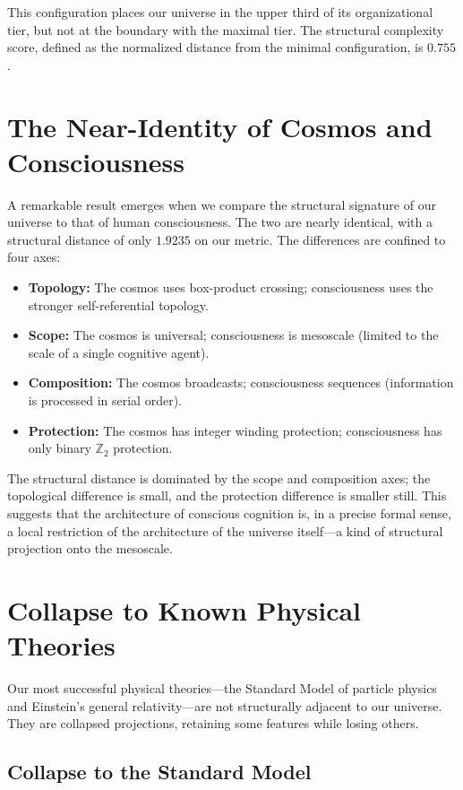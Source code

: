 \documentclass[11pt,a4paper]{article}
\theoremstyle{definition}
\begin{document}
This configuration places our universe in the upper third of its organizational tier, but not at the boundary with the maximal tier. The structural complexity score, defined as the normalized distance from the minimal configuration, is \(0.755\).

\section{The Near-Identity of Cosmos and Consciousness}

A remarkable result emerges when we compare the structural signature of our universe to that of human consciousness. The two are nearly identical, with a structural distance of only \(1.9235\) on our metric. The differences are confined to four axes:

\begin{itemize}
    \item \textbf{Topology:} The cosmos uses box-product crossing; consciousness uses the stronger self-referential topology.
    \item \textbf{Scope:} The cosmos is universal; consciousness is mesoscale (limited to the scale of a single cognitive agent).
    \item \textbf{Composition:} The cosmos broadcasts; consciousness sequences (information is processed in serial order).
    \item \textbf{Protection:} The cosmos has integer winding protection; consciousness has only binary \(\mathbb{Z}_2\) protection.
\end{itemize}

The structural distance is dominated by the scope and composition axes; the topological difference is small, and the protection difference is smaller still. This suggests that the architecture of conscious cognition is, in a precise formal sense, a local restriction of the architecture of the universe itself---a kind of structural projection onto the mesoscale.

\section{Collapse to Known Physical Theories}

Our most successful physical theories---the Standard Model of particle physics and Einstein's general relativity---are not structurally adjacent to our universe. They are collapsed projections, retaining some features while losing others.

\subsection{Collapse to the Standard Model}
\end{document}
